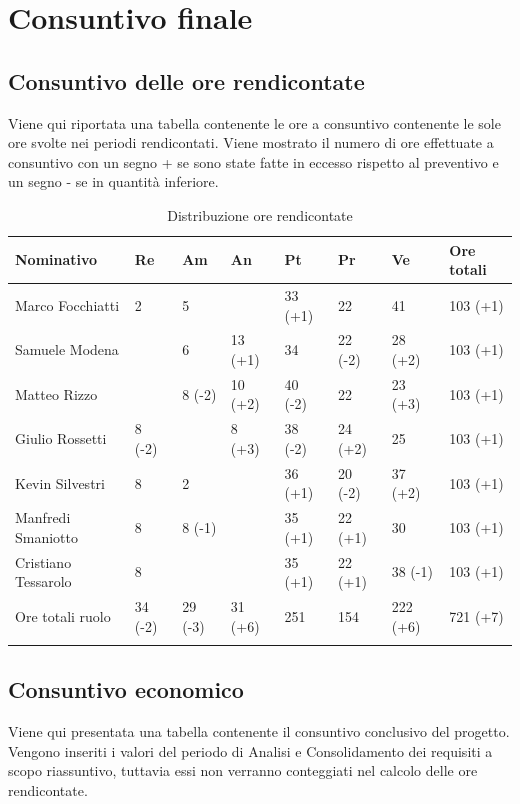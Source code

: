 \documentclass[./PianodiProgetto.tex]{subfiles}
\begin{document}
\section{Consuntivo finale}

\subsection{Consuntivo delle ore rendicontate}
Viene qui riportata una tabella contenente le ore a consuntivo contenente le sole ore svolte
nei periodi rendicontati. Viene mostrato il numero di ore effettuate a consuntivo con un
segno + se sono state fatte in eccesso rispetto al preventivo e un segno - se in quantità
inferiore.

\setlength\LTleft{-22mm}
\begin{longtable}{|p{38mm}|p{15mm}|p{15mm}|p{15mm}|p{15mm}|p{15mm}|p{17mm}|p{18mm}|}
		\hline
		Nominativo&Re&Am&An&Pt&Pr&Ve&Ore totali\\ \hline
		Marco Focchiatti&2&5& &33 (+1)&22&41&103 (+1) \\ \hline
		Samuele Modena& &6&13 (+1)&34&22 (-2)&28 (+2)&103 (+1) \\ \hline
		Matteo Rizzo& &8 (-2)&10 (+2)&40 (-2)&22&23 (+3)&103 (+1) \\ \hline
		Giulio Rossetti&8 (-2)& &8 (+3)&38 (-2)&24 (+2)&25&103 (+1) \\ \hline
		Kevin Silvestri&8&2& &36 (+1)&20 (-2)&37 (+2)&103 (+1) \\ \hline
		Manfredi Smaniotto&8&8 (-1)& &35 (+1)&22 (+1)&30&103 (+1) \\ \hline
		Cristiano Tessarolo&8& & &35 (+1)&22 (+1)&38 (-1)&103 (+1) \\  \hline
		Ore totali ruolo&34 (-2)&29 (-3)&31 (+6)&251&154&222 (+6)&721 (+7) \\ \hline
	\caption{Distribuzione ore rendicontate}
\end{longtable}

\subsection{Consuntivo economico}
Viene qui presentata una tabella contenente il consuntivo conclusivo del progetto. Vengono inseriti i valori del periodo di Analisi e Consolidamento dei requisiti a scopo riassuntivo,
tuttavia essi non verranno conteggiati nel calcolo delle ore rendicontate.
\end{document}
